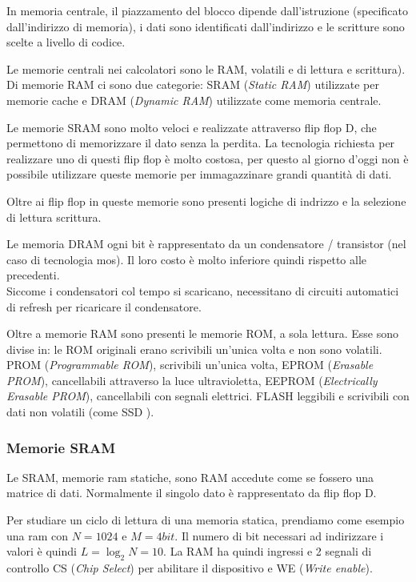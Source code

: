 \documentclass[../template]{subfiles}
\begin{document}
In memoria centrale, il piazzamento del blocco dipende dall'istruzione (specificato dall'indirizzo di memoria), i dati sono identificati dall'indirizzo e le scritture sono scelte a livello di codice.

Le memorie centrali nei calcolatori sono le RAM, volatili e di lettura e scrittura). Di memorie RAM ci sono due categorie:
SRAM (\textit{Static RAM}) utilizzate per memorie cache e DRAM (\textit{Dynamic RAM}) utilizzate come memoria centrale.

Le memorie SRAM sono molto veloci e realizzate attraverso flip flop D, che permettono di memorizzare il dato senza la perdita.
La tecnologia richiesta per realizzare uno di questi flip flop è molto costosa, per questo al giorno d'oggi non è possibile utilizzare queste memorie per immagazzinare grandi quantità di dati.

Oltre ai flip flop in queste memorie sono presenti logiche di indrizzo e la selezione di lettura scrittura.

Le memoria DRAM ogni bit è rappresentato da un condensatore / transistor (nel caso di tecnologia mos). Il loro costo è molto inferiore quindi rispetto alle precedenti.
\\
Siccome i condensatori col tempo si scaricano, necessitano di circuiti automatici di refresh per ricaricare il condensatore.

Oltre a memorie RAM sono presenti le memorie ROM, a sola lettura. Esse sono divise in:
le ROM originali erano scrivibili un'unica volta e non sono volatili.
PROM (\textit{Programmable ROM}), scrivibili un'unica volta,
EPROM (\textit{Erasable PROM}), cancellabili attraverso la luce ultravioletta,
EEPROM (\textit{Electrically Erasable PROM}), cancellabili con segnali elettrici.
FLASH leggibili e scrivibili con dati non volatili (come SSD ).


\subsubsection{Memorie SRAM}
Le SRAM, memorie ram statiche, sono RAM accedute come se fossero una matrice di dati.
Normalmente il singolo dato è rappresentato da flip flop D.

Per studiare un ciclo di lettura di una memoria statica, prendiamo come esempio una ram con $N=1024$ e $M = 4bit$.
Il numero di bit necessari ad indirizzare i valori è quindi $L = \log_2 N = 10$.
La RAM ha quindi ingressi e 2 segnali di controllo CS (\textit{Chip Select}) per abilitare il dispositivo e WE (\textit{Write enable}).
\end{document}

